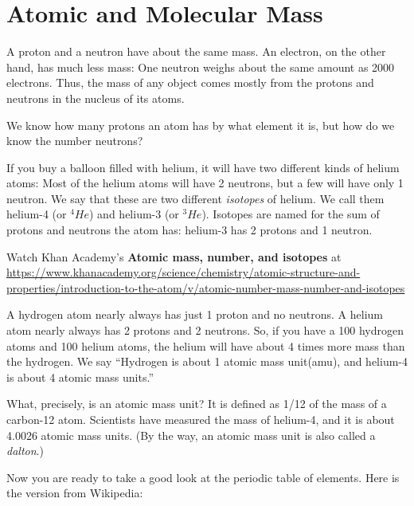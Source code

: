 \chapter{Atomic and Molecular Mass}

A proton and a neutron have about the same mass. An electron, on the
other hand, has much less mass: One neutron weighs about the same
amount as 2000 electrons. Thus, the mass of any object comes mostly
from the protons and neutrons in the nucleus of its atoms. 

We know how many protons an atom has by what element it is, but how do we know the number neutrons?

If you buy a balloon filled with helium, it will have two different
kinds of helium atoms: Most of the helium atoms will have 2 neutrons, but a
few will have only 1 neutron. We say that these are two different
\textit{isotopes} of helium. We call them helium-4 (or $^4He$) and
helium-3 (or $^3He$).  Isotopes are named for the sum of protons and
neutrons the atom has: helium-3 has 2 protons and 1 neutron.

Watch Khan Academy's \textbf{Atomic mass, number, and isotopes} at \url{https://www.khanacademy.org/science/chemistry/atomic-structure-and-properties/introduction-to-the-atom/v/atomic-number-mass-number-and-isotopes}

A hydrogen atom nearly always has just 1 proton and no neutrons. A
helium atom nearly always has 2 protons and 2 neutrons. So, if you
have a 100 hydrogen atoms and 100 helium atoms, the helium will have
about 4 times more mass than the hydrogen. We say ``Hydrogen is about
1 atomic mass unit(amu), and helium-4 is about 4 atomic mass
units.''

What, precisely, is an atomic mass unit? It is defined as 1/12 of
the mass of a carbon-12 atom. Scientists have measured the mass of
helium-4, and it is about 4.0026 atomic mass units. (By the way, an
atomic mass unit is also called a \textit{dalton}.)

\pagebreak

Now you are ready to take a good look at the periodic table of
elements. Here is the version from Wikipedia:

